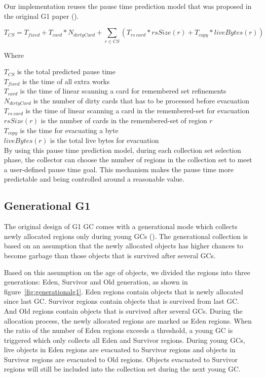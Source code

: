 Our implementation reuses the pause time prediction model that was proposed in the
original G1 paper (\cite{detlefs2004garbage}).

$$
T_{CS} = T_{fixed} + T_{card} * N_{dirtyCard} + \sum_{r\in CS} (T_{rs\ card} * rsSize(r) + T_{copy} * liveBytes(r))
$$

\noindent Where

\noindent$T_{CS}$ is the total predicted pause time\\
$T_{fixed}$ is the time of all extra works\\
$T_{card}$ is the time of linear scanning a card for remembered set refinements\\
$N_{dirtyCard}$ is the number of dirty cards that has to be processed before evacuation\\
$T_{rs\ card}$ is the time of linear scanning a card in the remembered-set for evacuation\\
$rsSize(r)$ is the number of cards in the remembered-set of region $r$\\
$T_{copy}$ is the time for evacuating a byte\\
$liveBytes(r)$ is the total live bytes for evacuation\\

By using this pause time prediction model, during each collection set selection phase,
the collector can choose the number of regions in the collection set to meet a
user-defined pause time goal. This mechanism makes the pause time more predictable
and being controlled around a reasonable value.

\subsection{Generational G1}

The original design of G1 GC comes with a generational mode which collects newly allocated regions only during young GCs (\cite{detlefs2004garbage}).
The generational collection is based on an assumption that the newly allocated objects
has higher chances to become garbage than those objects that is survived after several GCs.

Based on this assumption on the age of objects, we divided the regions into three generations: Eden, Survivor and Old generation,
as shown in figure~\ref{fig:generationalg1}.
Eden regions contain objects that is newly allocated since last GC.
Survivor regions contain objects that is survived from last GC.
And Old regions contain objects that is survived after several GCs.
During the allocation process, the newly allocated regions are marked as Eden regions.
When the ratio of the number of Eden regions exceeds a  threshold,
a young GC is triggered which only collects all Eden and Survivor regions.
During young GCs, live objects in Eden regions are evacuated to Survivor regions
and objects in Survivor regions are evacuated to Old regions.
Objects evacuated to Survivor regions will still be included into the collection set during the next young GC.

